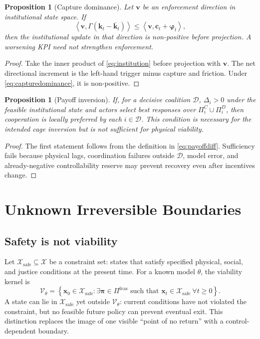 \documentclass[11pt,a4paper]{article}
\numberwithin{equation}{section}
\theoremstyle{definition}
\theoremstyle{plain}
\newtheorem{proposition}[definition]{Proposition}
\theoremstyle{remark}
\newcommand{\safe}{\mathcal{X}_{\mathrm{safe}}}
\newcommand{\policy}{\boldsymbol{\pi}}
\newcommand{\state}{\bm{x}}
\newcommand{\kpi}{\bm{k}}
\newcommand{\capture}{\bm{c}}
\begin{document}
\begin{proposition}[Capture dominance]
Let $\bm{v}$ be an enforcement direction in institutional state space. If
\begin{equation}
\left\langle \bm{v},\Gamma(\kpi_t-\bar{\kpi}_t)\right\rangle
\le
\left\langle \bm{v},\capture_t+\bm{\varphi}_t\right\rangle,
\label{eq:capturedominance}
\end{equation}
then the institutional update in that direction is non-positive before projection. A worsening KPI need not strengthen enforcement.
\end{proposition}

\begin{proof}
Take the inner product of \cref{eq:institution} before projection with $\bm{v}$. The net directional increment is the left-hand trigger minus capture and friction. Under \cref{eq:capturedominance}, it is non-positive.
\end{proof}

\begin{proposition}[Payoff inversion]
If, for a decisive coalition $\mathcal D$, $\Delta_i>0$ under the feasible institutional state and actors select best responses over $\Pi_i^C\cup\Pi_i^D$, then cooperation is locally preferred by each $i\in\mathcal D$. This condition is necessary for the intended cage inversion but is not sufficient for physical viability.
\end{proposition}

\begin{proof}
The first statement follows from the definition in \cref{eq:payoffdiff}. Sufficiency fails because physical lags, coordination failures outside $\mathcal D$, model error, and already-negative controllability reserve may prevent recovery even after incentives change.
\end{proof}

\section{Unknown Irreversible Boundaries}

\subsection{Safety is not viability}

Let $\safe\subseteq\mathcal X$ be a constraint set: states that satisfy specified physical, social, and justice conditions at the present time. For a known model $\theta$, the viability kernel is
\begin{equation}
\mathcal V_{\theta}=
\left\{
\state_0\in\safe:
\exists\policy\in\Pi^{\mathrm{feas}}
\text{ such that }
\state_t\in\safe\ \forall t\ge0
\right\}.
\label{eq:viability}
\end{equation}
A state can lie in $\safe$ yet outside $\mathcal V_{\theta}$: current conditions have not violated the constraint, but no feasible future policy can prevent eventual exit. This distinction replaces the image of one visible ``point of no return'' with a control-dependent boundary.
\end{document}
